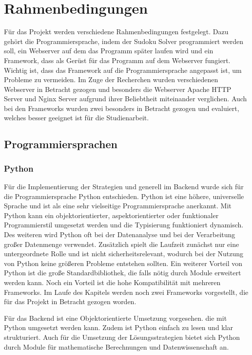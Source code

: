 
\chapter{Rahmenbedingungen}
Für das Projekt werden verschiedene Rahmenbedingungen festgelegt. Dazu gehört die Programmiersprache, indem der Sudoku Solver programmiert werden soll, ein Webserver auf dem das Programm später laufen wird und ein Framework, dass als Gerüst für das Programm auf dem Webserver fungiert. Wichtig ist, dass das Framework auf die Programmiersprache angepasst ist, um Probleme zu vermeiden. Im Zuge der Recherchen wurden verschiedenen Webserver in Betracht gezogen und besonders die Webserver Apache HTTP Server und Nginx Server aufgrund ihrer Beliebtheit miteinander verglichen. Auch bei den Frameworks wurden zwei besonders in Betracht gezogen und evaluiert, welches besser geeignet ist für die Studienarbeit.

\section{Programmiersprachen}
\subsection{Python}
Für die Implementierung der Strategien und generell im Backend wurde sich für die Programmiersprache Python entschieden. Python ist eine höhere, universelle Sprache und ist als eine sehr vielseitige Programmiersprache anerkannt. Mit Python kann ein objektorientierter, aspektorientierter oder funktionaler Programmierstil umgesetzt werden und die Typisierung funktioniert dynamisch. Des weiteren wird Python oft bei der Datenanalyse und bei der Verarbeitung großer Datenmenge verwendet. Zusätzlich spielt die Laufzeit zunächst nur eine untergeordnete Rolle und ist nicht sicherheitsrelevant, wodurch bei der Nutzung von Python keine größeren Probleme entstehen sollten.
Ein weiterer Vorteil von Python ist die große Standardbibliothek, die falls nötig durch Module erweitert werden kann. Noch ein Vorteil ist die hohe Kompatibilität mit mehreren Frameworks. Im Laufe des Kapitels werden noch zwei Frameworks vorgestellt, die für das Projekt in Betracht gezogen worden.

Für das Backend ist eine Objektorientierte Umsetzung vorgesehen. die mit Python umgesetzt werden kann. Zudem ist Python einfach zu lesen und klar strukturiert. Auch für die Umsetzung der Lösungsstrategien bietet sich Python durch Module für mathematische Berechnungen und Datenwissenschaft an. 

